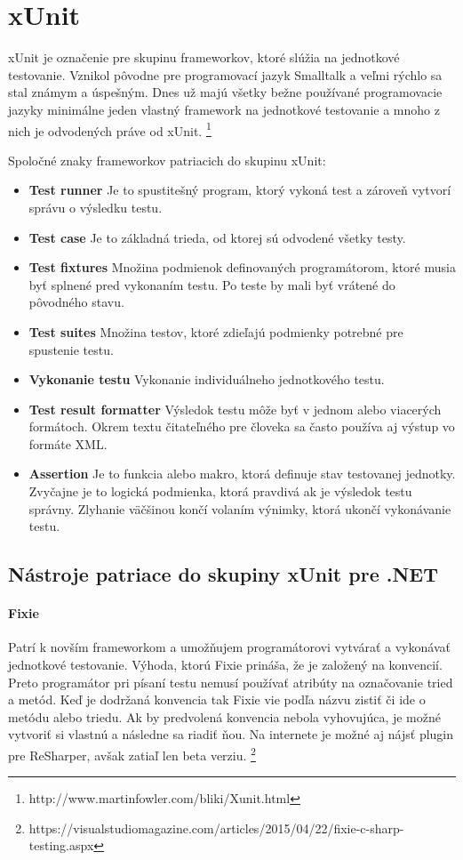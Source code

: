 \documentclass[11pt,twoside,slovak,a4paper]{article}
\begin{document}
	
	
	
	\section{xUnit}
		xUnit je označenie pre skupinu frameworkov, ktoré slúžia na jednotkové testovanie. Vznikol pôvodne pre programovací jazyk Smalltalk a veľmi rýchlo sa stal známym a úspešným. Dnes už majú všetky bežne používané programovacie jazyky minimálne jeden vlastný framework na jednotkové testovanie a mnoho z nich je odvodených práve od xUnit. 		\footnote{http://www.martinfowler.com/bliki/Xunit.html} \newline

		Spoločné znaky frameworkov patriacich do skupinu xUnit:
		\begin{itemize}
			\item \textbf{Test runner} Je to spustitešný program, ktorý vykoná test a zároveň vytvorí správu o výsledku testu.
			\item \textbf{Test case} Je to základná trieda, od ktorej sú odvodené všetky testy.
			\item \textbf{Test fixtures} Množina podmienok definovaných programátorom, ktoré musia byť splnené pred vykonaním testu. Po teste by mali byť vrátené do pôvodného stavu.
			\item \textbf{Test suites} Množina testov, ktoré zdieľajú podmienky potrebné pre spustenie testu.
			\item \textbf{Vykonanie testu} Vykonanie individuálneho jednotkového testu.
			\item \textbf{Test result formatter} Výsledok testu môže byť v jednom alebo viacerých formátoch. Okrem textu čitateľného pre človeka sa často používa aj výstup vo formáte XML.
			\item \textbf{Assertion} Je to funkcia alebo makro, ktorá definuje stav testovanej jednotky. Zvyčajne je to logická podmienka, ktorá pravdivá ak je výsledok testu správny. Zlyhanie väčšinou končí volaním výnimky, ktorá ukončí vykonávanie testu.
		\end{itemize}
		
		\subsection{Nástroje patriace do skupiny xUnit pre .NET}
			
			\paragraph{Fixie} Patrí k novším frameworkom a umožňujem programátorovi vytvárať a vykonávať jednotkové testovanie. Výhoda, ktorú Fixie prináša, že je založený na konvencií. Preto programátor pri písaní testu nemusí používať atribúty na označovanie tried a metód. Keď je dodržaná konvencia tak Fixie vie podľa názvu zistiť či ide o metódu alebo triedu. Ak by predvolená konvencia nebola vyhovujúca, je možné vytvoriť si vlastnú a následne sa riadiť ňou. Na internete je možné aj nájsť plugin pre ReSharper, avšak zatiaľ len beta verziu. \footnote{https://visualstudiomagazine.com/articles/2015/04/22/fixie-c-sharp-testing.aspx}
			
\end{document}
